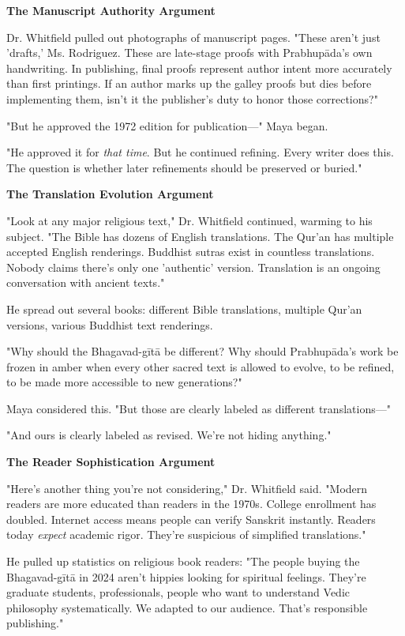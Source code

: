 \documentclass[12pt,twoside]{book}
\begin{document}
\textbf{\textbf{The Manuscript Authority Argument}}

Dr. Whitfield pulled out photographs of manuscript pages. "These aren't just 'drafts,' Ms. Rodriguez. These are late-stage proofs with Prabhupāda's own handwriting. In publishing, final proofs represent author intent more accurately than first printings. If an author marks up the galley proofs but dies before implementing them, isn't it the publisher's duty to honor those corrections?"

"But he approved the 1972 edition for publication—" Maya began.

"He approved it for \emph{that time}. But he continued refining. Every writer does this. The question is whether later refinements should be preserved or buried."

\textbf{\textbf{The Translation Evolution Argument}}

"Look at any major religious text," Dr. Whitfield continued, warming to his subject. "The Bible has dozens of English translations. The Qur'an has multiple accepted English renderings. Buddhist sutras exist in countless translations. Nobody claims there's only one 'authentic' version. Translation is an ongoing conversation with ancient texts."

He spread out several books: different Bible translations, multiple Qur'an versions, various Buddhist text renderings.

"Why should the Bhagavad-gītā be different? Why should Prabhupāda's work be frozen in amber when every other sacred text is allowed to evolve, to be refined, to be made more accessible to new generations?"

Maya considered this. "But those are clearly labeled as different translations—"

"And ours is clearly labeled as revised. We're not hiding anything."

\textbf{\textbf{The Reader Sophistication Argument}}

"Here's another thing you're not considering," Dr. Whitfield said. "Modern readers are more educated than readers in the 1970s. College enrollment has doubled. Internet access means people can verify Sanskrit instantly. Readers today \emph{expect} academic rigor. They're suspicious of simplified translations."

He pulled up statistics on religious book readers: "The people buying the Bhagavad-gītā in 2024 aren't hippies looking for spiritual feelings. They're graduate students, professionals, people who want to understand Vedic philosophy systematically. We adapted to our audience. That's responsible publishing."
\end{document}
